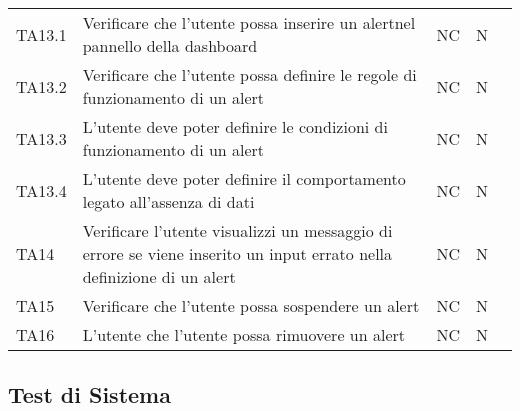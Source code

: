 \begin{longtable} {
		>{\centering}p{15mm} 
		>{\centering}p{79.5mm}
		>{\centering}p{15mm} 
		>{\centering}p{15mm}
		>{}p{0mm}}
	TA13.1 & Verificare che l'utente possa inserire un alert\glosp nel pannello della dashboard\glo & NC & N  &\TBstrut \\ [2mm]
	TA13.2 & Verificare che l'utente possa definire le regole di funzionamento di un alert\glo & NC & N  &\TBstrut \\ [2mm]
	TA13.3 & L'utente deve poter definire le condizioni di funzionamento di un alert\glo & NC & N  &\TBstrut \\ [2mm]
	TA13.4 & L'utente deve poter definire il comportamento legato all'assenza di dati  & NC & N  &\TBstrut \\ [2mm]
	TA14 & Verificare l'utente visualizzi un messaggio di errore se viene inserito un input errato nella definizione di un alert\glo & NC & N  &\TBstrut \\ [2mm]
	TA15 & Verificare che l'utente possa sospendere un alert\glo & NC & N  &\TBstrut \\ [2mm]
	TA16 & L'utente che l'utente possa rimuovere un alert\glo & NC & N  &\TBstrut \\ [2mm]
	
\end{longtable}


\subsection{Test di Sistema}

